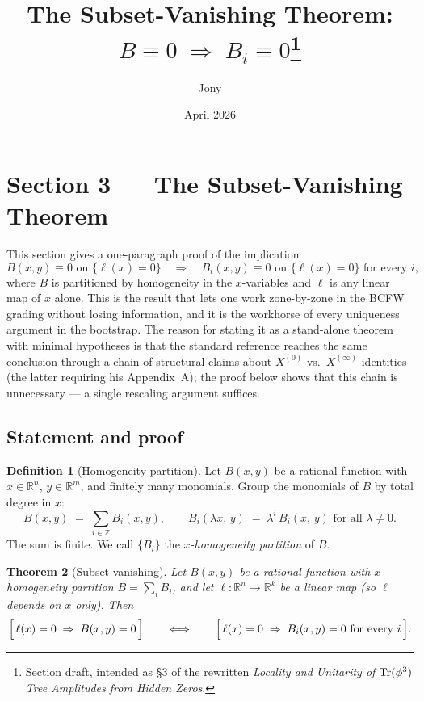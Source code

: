\documentclass[11pt]{article}
\title{The Subset-Vanishing Theorem: $B \equiv 0 \;\Rightarrow\; B_i \equiv 0$\thanks{Section draft, intended as \S3 of the rewritten \emph{Locality and Unitarity of $\mathrm{Tr}(\phi^3)$ Tree Amplitudes from Hidden Zeros}.}}
\author{Jony}
\date{April 2026}
\newtheorem{theorem}{Theorem}
\theoremstyle{definition}
\newtheorem{definition}[theorem]{Definition}
\newcommand{\R}{\mathbb{R}}
\newcommand{\Z}{\mathbb{Z}}
\begin{document}
\maketitle

\setcounter{section}{3}
\renewcommand{\thesection}{\arabic{section}}
\renewcommand{\thesubsection}{\thesection.\arabic{subsection}}

\section*{Section 3 --- The Subset-Vanishing Theorem}

\noindent
This section gives a one-paragraph proof of the implication
\[
B(x,y) \equiv 0 \text{ on } \{\ell(x) = 0\} \quad\Longrightarrow\quad B_i(x,y) \equiv 0 \text{ on } \{\ell(x) = 0\} \text{ for every } i,
\]
where $B$ is partitioned by homogeneity in the $x$-variables and $\ell$ is any linear map of $x$ alone. This is the result that lets one work zone-by-zone in the BCFW grading without losing information, and it is the workhorse of every uniqueness argument in the bootstrap. The reason for stating it as a stand-alone theorem with minimal hypotheses is that the standard reference \cite[eqs.~(15)--(18)]{Rodina} reaches the same conclusion through a chain of structural claims about $X^{(0)}$ vs.\ $X^{(\infty)}$ identities (the latter requiring his Appendix~A); the proof below shows that this chain is unnecessary --- a single rescaling argument suffices.

\subsection{Statement and proof}

\begin{definition}[Homogeneity partition]
Let $B(x,y)$ be a rational function with $x \in \R^n$, $y \in \R^m$, and finitely many monomials. Group the monomials of $B$ by total degree in $x$:
\[
B(x,y) \;=\; \sum_{i \in \Z} B_i(x,y), \qquad B_i(\lambda x,\, y) \;=\; \lambda^i \, B_i(x,\, y) \text{ for all } \lambda \neq 0.
\]
The sum is finite. We call $\{B_i\}$ the \emph{$x$-homogeneity partition} of $B$.
\end{definition}

\begin{theorem}[Subset vanishing]\label{thm:subset}
Let $B(x,y)$ be a rational function with $x$-homogeneity partition $B = \sum_i B_i$, and let $\ell : \R^n \to \R^k$ be a linear map (so $\ell$ depends on $x$ only). Then
\[
\Bigl[\, \ell(x) = 0 \;\Rightarrow\; B(x,y) = 0 \,\Bigr]
\qquad\Longleftrightarrow\qquad
\Bigl[\, \ell(x) = 0 \;\Rightarrow\; B_i(x,y) = 0 \text{ for every } i\, \Bigr].
\]
\end{theorem}
\end{document}
